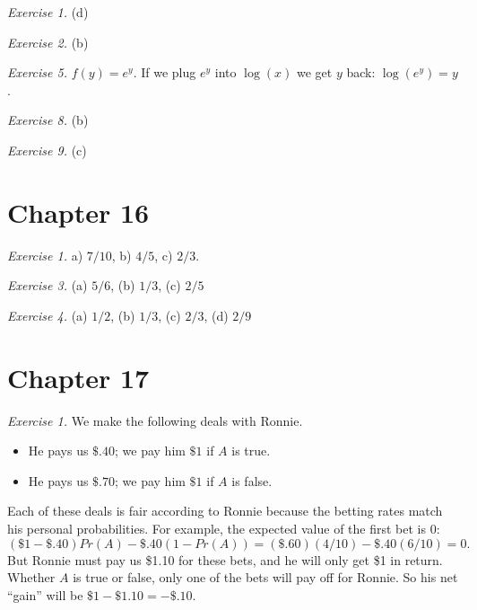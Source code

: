 \documentclass[justified]{tufte-book}
\providecommand{\tightlist}{%
  \setlength{\itemsep}{0pt}\setlength{\parskip}{0pt}}
\newcommand{\p}{Pr}
\begin{document}
\noindent
\emph{Exercise 1.} (d)

\vspace{.5em}

\noindent
\emph{Exercise 2.} (b)

\vspace{.5em}

\noindent
\emph{Exercise 5.} \(f(y) = e^y\). If we plug \(e^y\) into \(\log(x)\) we get \(y\) back: \(\log(e^y) = y\).

\vspace{.5em}

\noindent
\emph{Exercise 8.} (b)

\vspace{.5em}

\noindent
\emph{Exercise 9.} (c)

\hypertarget{chapter-16}{%
\section*{Chapter 16}\label{chapter-16}}

\noindent
\emph{Exercise 1.} a) \(7/10\), b) \(4/5\), c) \(2/3\).

\vspace{.5em}

\noindent
\emph{Exercise 3.} (a) \(5/6\), (b) \(1/3\), (c) \(2/5\)

\vspace{.5em}

\noindent
\emph{Exercise 4.} (a) \(1/2\), (b) \(1/3\), (c) \(2/3\), (d) \(2/9\)

\hypertarget{chapter-17}{%
\section*{Chapter 17}\label{chapter-17}}

\noindent
\emph{Exercise 1.} We make the following deals with Ronnie.

\begin{itemize}
\tightlist
\item
  He pays us \(\$.40\); we pay him \(\$1\) if \(A\) is true.
\item
  He pays us \(\$.70\); we pay him \(\$1\) if \(A\) is false.
\end{itemize}

Each of these deals is fair according to Ronnie because the betting rates match his personal probabilities. For example, the expected value of the first bet is 0:
\[ (\$1 - \$.40) \p(A) - \$.40 (1 - \p(A)) = (\$.60)(4/10) - \$.40(6/10) = 0. \]
But Ronnie must pay us \$1.10 for these bets, and he will only get \$1 in return. Whether \(A\) is true or false, only one of the bets will pay off for Ronnie. So his net ``gain'' will be \(\$1 - \$1.10 = -\$.10\).
\end{document}

